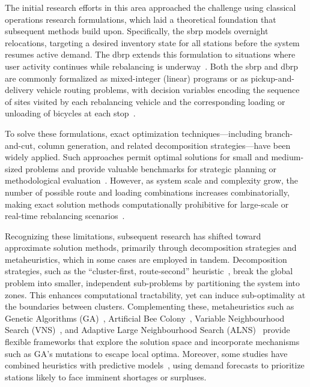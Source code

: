     The initial research efforts in this area approached the challenge using classical operations research formulations, which laid a theoretical foundation that subsequent methods build upon. Specifically, the \ac{sbrp} models overnight relocations, targeting a desired inventory state for all stations before the system resumes active demand. The \ac{dbrp} extends this formulation to situations where user activity continues while rebalancing is underway~\cite{Raviv2013}. Both the \ac{sbrp} and \ac{dbrp} are commonly formalized as mixed-integer (linear) programs or as pickup-and-delivery vehicle routing problems, with decision variables encoding the sequence of sites visited by each rebalancing vehicle and the corresponding loading or unloading of bicycles at each stop~\cite{Raviv2013, Chemla2013, DellAmico2014}.

    To solve these formulations, exact optimization techniques—including branch-and-cut, column generation, and related decomposition strategies—have been widely applied. Such approaches permit optimal solutions for small and medium-sized problems and provide valuable benchmarks for strategic planning or methodological evaluation~\cite{Chemla2013, DellAmico2014}. However, as system scale and complexity grow, the number of possible route and loading combinations increases combinatorially, making exact solution methods computationally prohibitive for large-scale or real-time rebalancing scenarios~\cite{Schuijbroek2017}.

    Recognizing these limitations, subsequent research has shifted toward approximate solution methods, primarily through decomposition strategies and metaheuristics, which in some cases are employed in tandem. Decomposition strategies, such as the ``cluster-first, route-second'' heuristic~\cite{Schuijbroek2017}, break the global problem into smaller, independent sub-problems by partitioning the system into zones. This enhances computational tractability, yet can induce sub-optimality at the boundaries between clusters. Complementing these, metaheuristics such as Genetic Algorithms (GA)~\cite{Li2016_Multiple}, Artificial Bee Colony~\cite{Shui2018}, Variable Neighbourhood Search (VNS)~\cite{Kloimullner2014, Raidl2013}, and Adaptive Large Neighbourhood Search (ALNS)~\cite{Liu2025} provide flexible frameworks that explore the solution space and incorporate mechanisms such as GA's mutations to escape local optima.  Moreover, some studies have combined heuristics with predictive models~\cite{He2021}, 
    using demand forecasts to prioritize stations likely to face imminent shortages or 
    surpluses.

